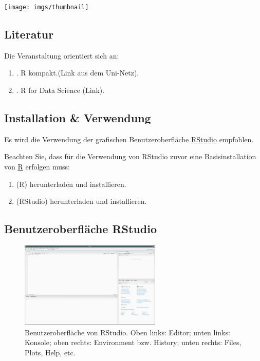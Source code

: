 \documentclass[
]{book}
\begin{document}
\begin{center}\texttt{[image: imgs/thumbnail]} \end{center}

\hypertarget{literatur}{%
\subsection*{Literatur}\label{literatur}}

Die Veranstaltung orientiert sich an:

\begin{enumerate}
\def\labelenumi{\arabic{enumi}.}
\item
  \citet{wollschlaegerKompaktSchnelleEinstieg2016} . R kompakt.(Link aus dem Uni-Netz).
\item
  \citet{grolemundDataScience} . R for Data Science (Link).
\end{enumerate}

\hypertarget{installation-verwendung}{%
\subsection*{Installation \& Verwendung}\label{installation-verwendung}}

Es wird die Verwendung der grafischen Benutzeroberfläche \href{http://www.rstudio.com}{RStudio} empfohlen.

Beachten Sie, dass für die Verwendung von RStudio zuvor eine Basisinstallation von \href{http://cran.r-project.org}{R} erfolgen muss:

\begin{enumerate}
\def\labelenumi{\arabic{enumi}.}
\item
  (R) herunterladen und installieren.
\item
  (RStudio) herunterladen und installieren.
\end{enumerate}

\hypertarget{benutzeroberfluxe4che-rstudio}{%
\subsection*{Benutzeroberfläche RStudio}\label{benutzeroberfluxe4che-rstudio}}

\begin{figure}
\centering
\includegraphics[width=0.6\textwidth,height=\textheight]{imgs/RStudio_003.jpg}
\caption{Benutzeroberfläche von RStudio. Oben links: Editor; unten links: Konsole; oben rechts: Environment bzw. History; unten rechts: Files, Plots, Help, etc.}
\end{figure}
\end{document}
